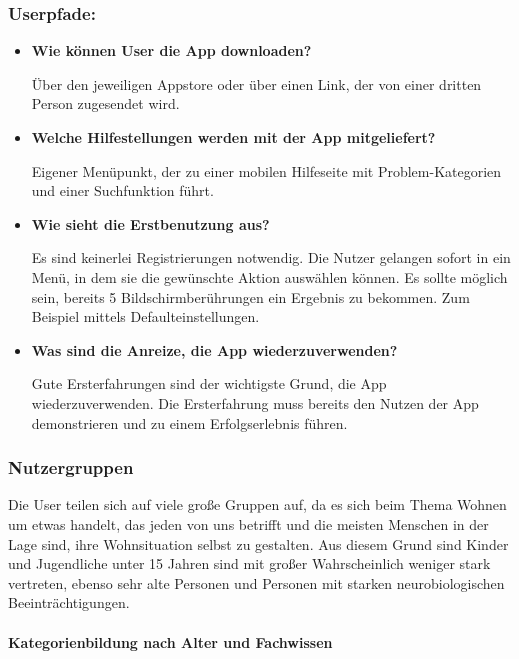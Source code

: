 \documentclass[12pt,paper=a4,oneside,hidelinks,headings=small,captions=heading,captions=nooneline]{scrartcl}
\begin{document}
\subsubsection{Userpfade:}
\label{sec:org8c045cc}
\begin{itemize}
\item \textbf{Wie können User die App downloaden?}

Über den jeweiligen Appstore oder über einen Link, der von einer
dritten Person zugesendet wird.

\item \textbf{Welche Hilfestellungen werden mit der App mitgeliefert?}

Eigener Menüpunkt, der zu einer mobilen Hilfeseite mit Problem-Kategorien
und einer Suchfunktion führt.

\item \textbf{Wie sieht die Erstbenutzung aus?}

Es sind keinerlei Registrierungen notwendig. Die Nutzer gelangen
sofort in ein Menü, in dem sie die gewünschte Aktion auswählen
können. Es sollte möglich sein, bereits 5 Bildschirmberührungen ein
Ergebnis zu bekommen. Zum Beispiel mittels Defaulteinstellungen.

\item \textbf{Was sind die Anreize, die App wiederzuverwenden?}

Gute Ersterfahrungen sind der wichtigste Grund, die App
wiederzuverwenden. Die Ersterfahrung muss bereits den Nutzen der App
demonstrieren und zu einem Erfolgserlebnis führen.
\end{itemize}

\subsubsection{Nutzergruppen}
\label{sec:org975a417}

Die User teilen sich auf viele große Gruppen auf, da es sich beim
Thema Wohnen um etwas handelt, das jeden von uns betrifft und die
meisten Menschen in der Lage sind, ihre Wohnsituation selbst zu
gestalten. Aus diesem Grund sind Kinder und Jugendliche unter 15
Jahren sind mit großer Wahrscheinlich weniger stark vertreten, ebenso
sehr alte Personen und Personen mit starken neurobiologischen
Beeinträchtigungen.

\paragraph{Kategorienbildung nach Alter und Fachwissen}
\label{sec:org94989de}
\end{document}
